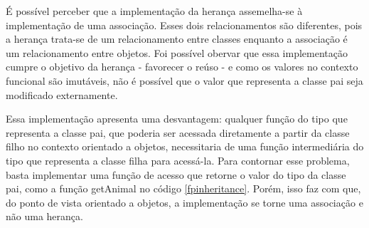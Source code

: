 É possível perceber que a implementação da herança 
assemelha-se à implementação de uma associação. 
Esses dois relacionamentos são diferentes, pois a 
herança trata-se de um relacionamento entre 
classes enquanto a associação é um relacionamento 
entre objetos\cite{umlsystems}. Foi possível 
obervar que essa implementação cumpre o objetivo 
da herança - favorecer o reúso - e como os valores 
no contexto funcional são imutáveis, não é possível 
que o valor que representa a classe pai seja 
modificado externamente.

Essa implementação apresenta uma desvantagem: 
qualquer função do tipo que representa 
a classe pai, que poderia ser acessada 
diretamente a partir da classe filho 
no contexto orientado a objetos, 
necessitaria de uma função intermediária 
do tipo que representa a classe filha 
para acessá-la. Para contornar esse 
problema, basta implementar uma função 
de acesso que retorne o valor do tipo 
da classe pai, como a função getAnimal 
no código \ref{fpinheritance}. Porém, isso 
faz com que, do ponto de vista orientado a 
objetos, a implementação se torne uma 
associação e não uma herança. 